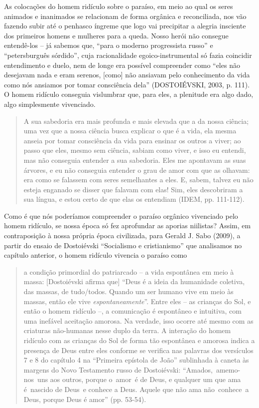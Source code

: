 As colocações do homem ridículo sobre o paraíso, em meio ao qual os
seres animados e inanimados se relacionam de forma orgânica e
reconciliada, nos vão fazendo subir até o penhasco íngreme que logo vai
precipitar a alegria insciente dos primeiros homens e mulheres para a
queda. Nosso herói não consegue entendê-los -- já sabemos que, ``para o
moderno progressista russo'' e ``petersburguês sórdido'', cuja
racionalidade egoico-instrumental só fazia coincidir entendimento e
duelo, nem de longe era possível compreender como ``eles não desejavam
nada e eram serenos, {[}como{]} não ansiavam pelo conhecimento da vida
como nós ansiamos por tomar consciência dela'' (DOSTOIÉVSKI, 2003, p.
111). O homem ridículo conseguia vislumbrar que, para eles, a plenitude
era algo dado, algo simplesmente vivenciado.

\begin{quote}
A sua sabedoria era mais profunda e mais elevada que a da nossa ciência;
uma vez que a nossa ciência busca explicar o que é a vida, ela mesma
anseia por tomar consciência da vida para ensinar os outros a viver; ao
passo que eles, mesmo sem ciência, sabiam como viver, e isso eu entendi,
mas não conseguia entender a sua sabedoria. Eles me apontavam as suas
árvores, e eu não conseguia entender o grau de amor com que as olhavam:
era como se falassem com seres semelhantes a eles. E, sabem, talvez eu
não esteja enganado se disser que falavam com elas! Sim, eles
descobriram a sua língua, e estou certo de que elas os entendiam (IDEM,
pp. 111-112).
\end{quote}

Como é que nós poderíamos compreender o paraíso orgânico vivenciado pelo
homem ridículo, se nossa época só fez aprofundar as aporias niilistas?
Assim, em contraposição à nossa própria época civilizada, para Gerald J.
Sabo (2009), a partir do ensaio de Dostoiévski ``Socialismo e
cristianismo'' que analisamos no capítulo anterior, o homem ridículo
vivencia o paraíso como

\begin{quote}
a condição primordial do patriarcado -- a vida espontânea em meio à
massa: {[}Dostoiévski afirma que{]} ``Deus é a ideia da humanidade
coletiva, das massas, de tudo/todos. Quando um ser humano vive em meio
às massas, então ele vive \emph{espontaneamente}''. Entre eles -- as
crianças do Sol, e então o homem ridículo --, a comunicação é espontâneo
e intuitiva, com uma inefável aceitação amorosa. Na verdade, isso ocorre
até mesmo com as criaturas não-humanas nesse duplo da terra. A interação
do homem ridículo com as crianças do Sol de forma tão espontânea e
amorosa indica a presença de Deus entre eles conforme se verifica nas
palavras dos versículos 7 e 8 do capítulo 4 na ``Primeira epístola de
João'' sublinhada à caneta às margens do Novo Testamento russo de
Dostoiévski: ``Amados,~amemo-nos~uns aos outros, porque o~amor~é de
Deus, e qualquer um que ama é~nascido de Deus~e conhece a Deus. Aquele
que não ama não~conhece~a Deus, porque Deus é amor'' (pp. 53-54).
\end{quote}

